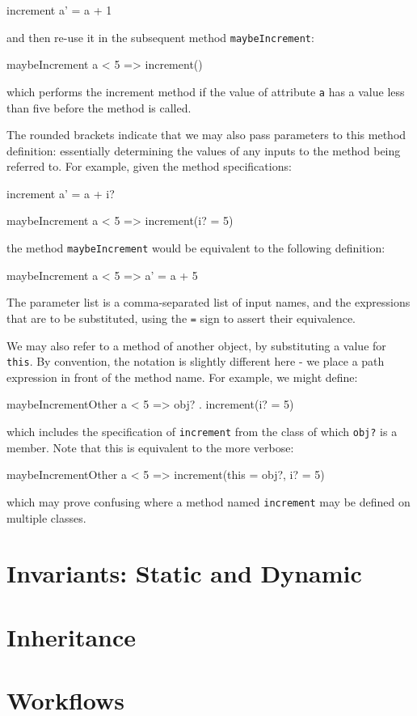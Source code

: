 \begin{code}
  increment { a' = a + 1 }
\end{code}

and then re-use it in the subsequent method \verb|maybeIncrement|:

\begin{code}
  maybeIncrement { a < 5 => increment() }
\end{code}

which performs the increment method if the value of attribute \verb|a|
has a value less than five before the method is called.

The rounded brackets indicate that we may also pass parameters to this
method definition: essentially determining the values of any inputs to
the method being referred to.  For example, given the method
specifications:

\begin{code}
  increment { a' = a + i? }

  maybeIncrement { a < 5 => increment(i? = 5) }
\end{code}

the method \verb|maybeIncrement| would be equivalent to the following
definition:

\begin{code}
  maybeIncrement { a < 5 => a' = a + 5 }
\end{code}

The parameter list is a comma-separated list of input names, and the
expressions that are to be substituted, using the \verb|=| sign to
assert their equivalence.

We may also refer to a method of another object, by substituting a
value for \verb|this|.  By convention, the notation is slightly
different here - we place a path expression in front of the method
name.  For example, we might define:

\begin{code}
  maybeIncrementOther { a < 5 => obj? . increment(i? = 5) }
\end{code}

which includes the specification of \verb|increment| from the class of which
\verb|obj?| is a member.  Note that this is equivalent to the more verbose:

\begin{code}
  maybeIncrementOther { a < 5 => increment(this = obj?, i? = 5) }
\end{code}

which may prove confusing where a method named \verb|increment| may be
defined on multiple classes.



\section{Invariants: Static and Dynamic}

\section{Inheritance}

\section{Workflows}